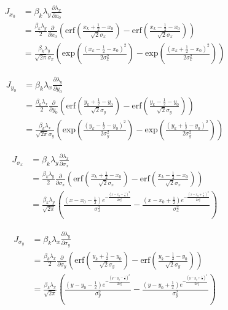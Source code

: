 \begin{align*}
J_{x_{0}} &= \beta_{k}\lambda_{y}\frac{\partial \lambda_{x}}{\partial x_{0}} \\
&= \frac{\beta_{k}\lambda_{y}}{2}\frac{\partial}{\partial x_{0}}\left(\mathrm{erf}\left(\frac{x_{k}+\frac{1}{2}-x_{0}}{\sqrt{2}\sigma_{x}}\right) -\mathrm{erf}\left(\frac{x_{k}-\frac{1}{2}-x_{0}}{\sqrt{2}\sigma_{x}}\right)\right)\\
&= \frac{\beta_{k}\lambda_{y}}{\sqrt{2\pi}\sigma_{x}}\left(\mathrm{exp}\left(\frac{(x_{k}-\frac{1}{2}-x_{0})^{2}}{2\sigma_{x}^{2}}\right) -\mathrm{exp}\left(\frac{(x_{k}+\frac{1}{2}-x_{0})^{2}}{2\sigma_{x}^{2}}\right)\right)
\end{align*}

\begin{align*}
J_{y_{0}} &= \beta_{k}\lambda_{x}\frac{\partial \lambda_{y}}{\partial y_{0}} \\
&= \frac{\beta_{k}\lambda_{x}}{2}\frac{\partial}{\partial y_{0}}\left(\mathrm{erf}\left(\frac{y_{k}+\frac{1}{2}-y_{0}}{\sqrt{2}\sigma_{y}}\right) -\mathrm{erf}\left(\frac{y_{k}-\frac{1}{2}-y_{0}}{\sqrt{2}\sigma_{y}}\right)\right)\\
&= \frac{\beta_{k}\lambda_{x}}{\sqrt{2\pi}\sigma_{y}}\left(\mathrm{exp}\left(\frac{(y_{k}-\frac{1}{2}-y_{0})^{2}}{2\sigma_{y}^{2}}\right) -\mathrm{exp}\left(\frac{(y_{k}+\frac{1}{2}-y_{0})^{2}}{2\sigma_{y}^{2}}\right)\right)
\end{align*}

\begin{align*}
J_{\sigma_{x}} &= \beta_{k}\lambda_{y}\frac{\partial \lambda_{x}}{\partial \sigma_{x}} \\
&= \frac{\beta_{k}\lambda_{y}}{2}\frac{\partial}{\partial \sigma_{x}}\left(\mathrm{erf}\left(\frac{x_{k}+\frac{1}{2}-x_{0}}{\sqrt{2}\sigma_{x}}\right) -\mathrm{erf}\left(\frac{x_{k}-\frac{1}{2}-x_{0}}{\sqrt{2}\sigma_{x}}\right)\right)\\
&= \frac{\beta_{k}\lambda_{y}}{\sqrt{2\pi}}\left(\frac{\left(x-x_{0}-\frac{1}{2}\right) e^{-\frac{\left(x-x_{0}-\frac{1}{2}\right)^2}{2 \sigma_{x} ^2}}}{\sigma_{x} ^2}-\frac{ \left(x-x_{0}+\frac{1}{2}\right) e^{-\frac{\left(x-x_{0}+\frac{1}{2}\right)^2}{2 \sigma_{x} ^2}}}{\sigma_{x} ^2}\right)
\end{align*}

\begin{align*}
J_{\sigma_{y}} &= \beta_{k}\lambda_{x}\frac{\partial \lambda_{y}}{\partial \sigma_{y}} \\
&= \frac{\beta_{k}\lambda_{x}}{2}\frac{\partial}{\partial \sigma_{y}}\left(\mathrm{erf}\left(\frac{y_{k}+\frac{1}{2}-y_{0}}{\sqrt{2}\sigma_{y}}\right) -\mathrm{erf}\left(\frac{y_{k}-\frac{1}{2}-y_{0}}{\sqrt{2}\sigma_{y}}\right)\right)\\
&= \frac{\beta_{k}\lambda_{x}}{\sqrt{2\pi}}\left(\frac{\left(y-y_{0}-\frac{1}{2}\right) e^{-\frac{\left(y-y_{0}-\frac{1}{2}\right)^2}{2 \sigma_{y} ^2}}}{\sigma_{y} ^2}-\frac{ \left(y-y_{0}+\frac{1}{2}\right) e^{-\frac{\left(y-y_{0}+\frac{1}{2}\right)^2}{2 \sigma_{y} ^2}}}{\sigma_{y} ^2}\right)
\end{align*}

